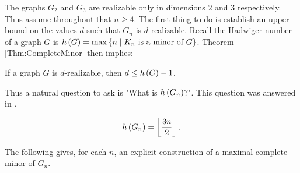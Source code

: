     The graphs \(G_2\) and \(G_3\) are realizable only in dimensions \(2\) and \(3\) respectively.  Thus assume throughout that \(n\ge 4\).  The first thing to do is establish an upper bound on the values \(d\) such that \(G_n\) is \(d\)-realizable.  Recall the Hadwiger number of a graph \(G\) is \(\had G=\max\setb{n}{K_n\text{ is a minor of }G}\).  Theorem \ref{Thm:CompleteMinor} then implies:
    \begin{Cor}\label{Cor:HadBound}
        If a graph \(G\) is \(d\)-realizable, then \(d\le h\left(G\right)-1\).
    \end{Cor}

    Thus a natural question to ask is "What is \(h\left(G_n\right)\)?".  This question was answered in \cite{Halin}.

    \begin{Theorem}[Halin 1966]\label{Thm:Halin}
        \[h\left(G_n\right)=\left\lfloor\frac{3n}2\right\rfloor.\]
    \end{Theorem}
        The following gives, for each \(n\), an explicit construction of a maximal complete minor of \(G_n\).

